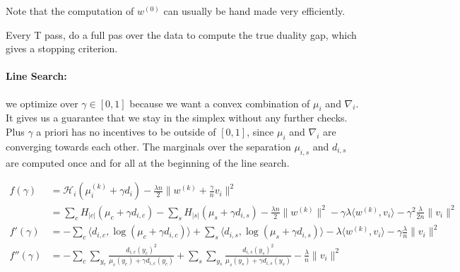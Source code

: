 \documentclass{article}
\DeclareMathOperator{\1}{\mathbb{1}}
\begin{document}
Note that the computation of $w^{(0)}$ can usually be hand made very efficiently.

Every T pass, do a full pas over the data to compute the true duality gap, which gives a stopping criterion.

\paragraph{Line Search:} we optimize over $\gamma \in [0,1]$ because we want a convex combination of $\mu_i$ and $\nabla_i$.
It gives us a guarantee that we stay in the simplex without any further checks.
Plus $\gamma$ a priori has no incentives to be outside of $[0,1]$, since $\mu_i$ and $\nabla_i$ are converging towards each other.
The marginals over the separation $\mu_{i, s}$ and $d_{i, s}$ are computed once and for all at the beginning of the line search.

\begin{align*}
	f(\gamma)
	& = \mathcal H_i(\mu_i^{(k)} + \gamma d_i) 
	- \frac{\lambda n}{2} \| w^{(k)} + \frac{\gamma}{n} v_i \|^2 
	\\
	& =  \sum_c H_{|c|}(\mu_c + \gamma d_{i, c}) 
	- \sum_s H_{|s|}(\mu_s + \gamma d_{i, s}) 
	- \frac{\lambda n}{2} \| w^{(k)}\|^2 
	- \gamma \lambda  \langle w^{(k)} , v_i \rangle 
	- \gamma^2 \frac{\lambda}{2n} \|v_i \|^2 
	\\
	f'(\gamma) & =  - \sum_c \langle d_{i, c}, \log(\mu_c + \gamma d_{i, c}) \rangle 
	+ \sum_s \langle d_{i, s} , \log(\mu_s + \gamma d_{i, s}) \rangle 
	- \lambda  \langle w^{(k)} , v_i \rangle 
	- \gamma \frac{\lambda}{n} \|v_i \|^2 
	\\
	f''(\gamma) & = - \sum_c \sum_{y_c} \frac{d_{i, c}(y_c)^2 }{ \mu_c(y_c) + \gamma d_{i, c}(y_c) }
	+ \sum_s \sum_{y_s} \frac{d_{i, s}(y_s)^2 }{ \mu_s(y_s) + \gamma d_{i, s}(y_s) }
	- \frac{\lambda}{n} \|v_i \|^2 
\end{align*}




\end{document}
